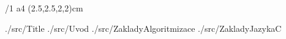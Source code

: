 

\cslang
\typosize[12/14]
\margins/1 a4 (2.5,2.5,2,2)cm


\def\rootpath{./src/}
\def\imgpath{./img/}

 {\rootpath Title}
 {\rootpath Uvod}
 {\rootpath ZakladyAlgoritmizace}
 {\rootpath ZakladyJazykaC}
\bye

